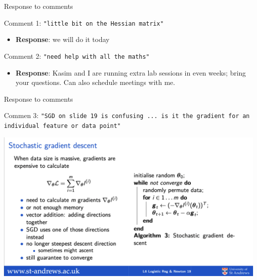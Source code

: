 \documentclass[ignorenonframetext,aspectratio=169]{beamer}
\providecommand{\tightlist}{%
  \setlength{\itemsep}{0pt}\setlength{\parskip}{0pt}}
\begin{document}
\begin{frame}{Response to comments}
\protect\hypertarget{response-to-comments}{}

Comment 1: \texttt{"little bit on the Hessian matrix"}

\begin{itemize}
\tightlist
\item
  \textbf{Response}: we will do it today
\end{itemize}

Comment 2: \texttt{"need help with all the maths"}

\begin{itemize}
\tightlist
\item
  \textbf{Response}: Kasim and I are running extra lab sessions in even
  weeks; bring your questions. Can also schedule meetings with me.
\end{itemize}

\end{frame}

\begin{frame}{Response to comments}
\protect\hypertarget{response-to-comments-1}{}

Commen 3:
\texttt{"SGD on slide 19 is confusing ... is it the gradient for an individual feature or data point"}

\begin{center}\includegraphics[width=0.75\linewidth]{./figs/sgdresponse} \end{center}

\end{frame}
\end{document}
